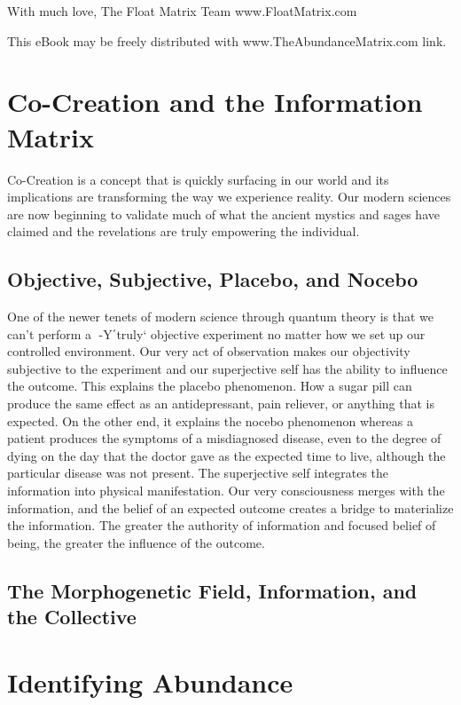 \documentclass[12pt]{report}
\begin{document}
With much love,
The Float Matrix Team
www.FloatMatrix.com

This eBook may be freely distributed with
www.TheAbundanceMatrix.com link.


\chapter{Co-Creation and the Information Matrix}

Co-Creation is a concept that is quickly surfacing in our
world and its implications are transforming the way we experience
reality. Our modern sciences are now beginning to validate much of
what the ancient mystics and sages have claimed and the revelations
are truly empowering the individual.

\section{Objective, Subjective, Placebo, and Nocebo}

One of the newer tenets
of modern science through quantum theory is that we can’t perform
a -Y΄truly‘ objective experiment no matter how we set up our controlled
environment. Our very act of observation makes our objectivity
subjective to the experiment and our superjective self has the
ability to influence the outcome. This explains the placebo phenomenon.
How a sugar pill can produce the same effect as an antidepressant,
pain reliever, or anything that is expected. On the other
end, it explains the nocebo phenomenon whereas a patient produces
the symptoms of a misdiagnosed disease, even to the degree
of dying on the day that the doctor gave as the expected time
to live, although the particular disease was not present. The superjective
self integrates the information into physical manifestation.
Our very consciousness merges with the information, and the belief
of an expected outcome creates a bridge to materialize the information.
The greater the authority of information and focused belief of
being, the greater the influence of the outcome.

\section{The Morphogenetic Field, Information, and the Collective}



\chapter{Identifying Abundance}
\end{document}
